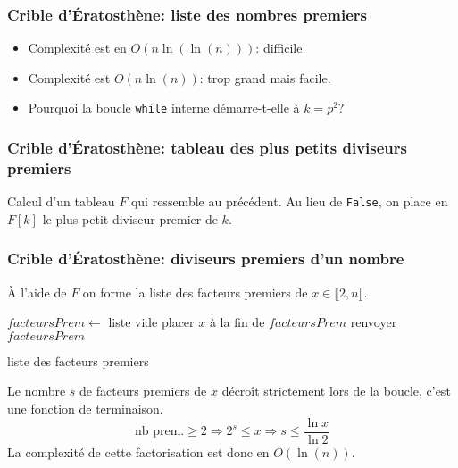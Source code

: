 \begin{frame}
  \frametitle{Crible d'\'Eratosthène: liste des nombres premiers}

\begin{itemize}
  \item Complexité est en $O(n\ln(\ln(n)))$: difficile.
  \item Complexité est $O(n\ln(n))$: trop grand mais facile.
  \item Pourquoi la boucle \texttt{while} interne démarre-t-elle à $k=p^2$?
\end{itemize}
\end{frame}

\begin{frame}
  \frametitle{Crible d'\'Eratosthène: tableau des plus petits diviseurs premiers}
Calcul d'un tableau $F$ qui ressemble au précédent. Au lieu de \texttt{False}, on place en $F[k]$ le plus petit diviseur premier de $k$.

\end{frame}

\begin{frame}
  \frametitle{Crible d'\'Eratosthène: diviseurs premiers d'un nombre}
\`A l'aide de $F$ on forme la liste des facteurs premiers de $x\in  \llbracket 2,n\rrbracket$.
\begin{algorithm}[H]
  $facteursPrem \leftarrow$ liste vide \;
  placer $x$ à la fin de $facteursPrem$\;
  renvoyer $facteursPrem$ \;
  \caption{liste des facteurs premiers}
  \label{complexite_4}
\end{algorithm}
Le nombre $s$ de facteurs premiers de $x$ décroît strictement lors de la boucle, c'est une fonction de terminaison.\newline
\begin{displaymath}
  \text{nb prem.}\geq 2 \Rightarrow 2^s \leq x \Rightarrow s\leq \frac{\ln x}{\ln 2}
\end{displaymath}
La complexité de cette factorisation est donc en $O(\ln(n))$.
\end{frame}


